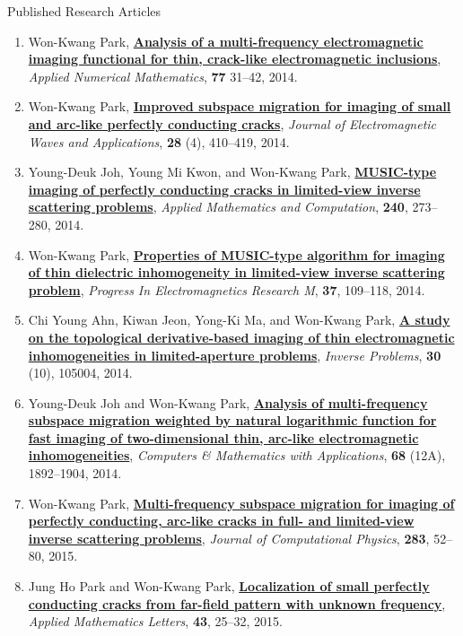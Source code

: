 \documentclass{resume} %
\begin{document}
\begin{rSection}{Published Research Articles}
\begin{enumerate}
\item\label{A-APNUM2014} Won-Kwang Park, \href{http://dx.doi.org/10.1016/j.apnum.2013.11.001}{\textbf{Analysis of a multi-frequency electromagnetic imaging functional for thin, crack-like electromagnetic inclusions}}, \textit{Applied Numerical Mathematics}, \textbf{77} 31--42, 2014.
\item\label{A-JEMEA2014} Won-Kwang Park, \href{http://dx.doi.org/10.1080/09205071.2013.866526}{\textbf{Improved subspace migration for imaging of small and arc-like perfectly conducting cracks}}, \textit{Journal of Electromagnetic Waves and Applications}, \textbf{28} (4), 410--419, 2014.
\item\label{A-AMC2014} Young-Deuk Joh, Young Mi Kwon, and Won-Kwang Park, \href{http://dx.doi.org/10.1016/j.amc.2014.04.097}{\textbf{MUSIC-type imaging of perfectly conducting cracks in limited-view inverse scattering problems}}, \textit{Applied Mathematics and Computation}, \textbf{240}, 273--280, 2014.
\item\label{A-PIERM2014} Won-Kwang Park, \href{http://dx.doi.org/10.2528/PIERM14050403}{\textbf{Properties of MUSIC-type algorithm for imaging of thin dielectric inhomogeneity in limited-view inverse scattering problem}}, \textit{Progress In Electromagnetics Research M}, \textbf{37}, 109--118, 2014.
\item\label{A-IP2014} Chi Young Ahn, Kiwan Jeon, Yong-Ki Ma, and Won-Kwang Park, \href{http://dx.doi.org/10.1088/0266-5611/30/10/105004}{\textbf{A study on the topological derivative-based imaging of thin electromagnetic inhomogeneities in limited-aperture problems}}, \textit{Inverse Problems}, \textbf{30} (10), 105004, 2014.
\item\label{A-CAMWA2014} Young-Deuk Joh and Won-Kwang Park, \href{http://dx.doi.org/10.1016/j.camwa.2014.10.005}{\textbf{Analysis of multi-frequency subspace migration weighted by natural logarithmic function for fast imaging of two-dimensional thin, arc-like electromagnetic inhomogeneities}}, \textit{Computers \& Mathematics with Applications}, \textbf{68} (12A), 1892--1904, 2014.
\item\label{A-JCOMP2015A} Won-Kwang Park, \href{http://dx.doi.org/10.1016/j.jcp.2014.11.036}{\textbf{Multi-frequency subspace migration for imaging of perfectly conducting, arc-like cracks in full- and limited-view inverse scattering problems}}, \textit{Journal of Computational Physics}, \textbf{283}, 52--80, 2015.
\item\label{A-AML2015} Jung Ho Park and Won-Kwang Park, \href{http://dx.doi.org/10.1016/j.aml.2014.11.008}{\textbf{Localization of small perfectly conducting cracks from far-field pattern with unknown frequency}}, \textit{Applied Mathematics Letters}, \textbf{43}, 25--32, 2015.

\end{enumerate}
\end{rSection}
\end{document}
